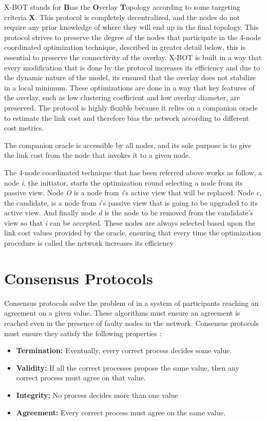 X-BOT \cite{xbot} stands for \textbf{B}ias the \textbf{O}verlay \textbf{T}opology
according to some targeting criteria \textbf{X}. This protocol is completely decentralized,
and the nodes do not require any prior knowledge of where they will end up in the final topology. 
This protocol strives to preserve the degree of the nodes that participate in the 4-node coordinated
optimization technique, described in greater detail below, this is essential to preserve
the connectivity of the overlay. X-BOT is built in a way that every modification that is
done by the protocol increases its efficiency and due to the dynamic nature of the model,
its ensured that the overlay does not stabilize in a local minimum. These optimizations
are done in a way that key features of the overlay, such as low clustering coefficient and
low overlay diameter, are preserved. The protocol is highly flexible because it relies on a
companion oracle to estimate the link cost and therefore bias the network according to
different cost metrics.

The companion oracle is accessible by all nodes, and its sole purpose is to give the
link cost from the node that invokes it to a given node.

The 4-node coordinated technique that has been referred above works as follow, a
node \textit{i}, the initiator, starts the optimization round selecting a node from
its passive view. Node \textit{O} is a node from \textit{i}'s active view that
will be replaced. Node \textit{c}, the candidate, is a node from \textit{i}'s passive
view that is going to be upgraded to its active view. And finally node \textit{d}
is the node to be removed from the candidate's view so that \textit{i} can be accepted.
These nodes are always selected based upon the link cost values provided by the oracle,
ensuring that every time the optimization procedure is called the network increases its
efficiency

\section{Consensus Protocols}
\label{sec:consensus}

Consensus protocols solve the problem of in a system of participants reaching
an agreement on a given value. These algorithms must ensure an agreement is reached
even in the presence of faulty nodes in the network. Consensus protocols must ensure
they satisfy the following properties \cite{distributed_systems_concepts}:
\begin{itemize}
  \item \textbf{Termination:} Eventually, every correct process decides some value.
  \item \textbf{Validity:} If all the correct processes propose the same value,
then any correct process must agree on that value.
  \item \textbf{Integrity:} No process decides more than one value
  \item \textbf{Agreement:} Every correct process must agree on the same value.
\end{itemize}

